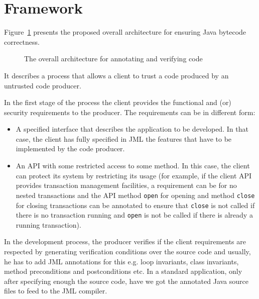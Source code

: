 \section{Framework}
\label{architecture_s}	
Figure~\ref{architecture} presents the proposed overall architecture for ensuring Java bytecode correctness. 
\begin{figure}[ht!]
\begin{center}
\caption{The overall architecture for annotating and verifying code}
\label{architecture}
\end{center}
\end{figure}
It describes a process that allows a client to trust a code produced by an untrusted code producer.

In the first stage of the process the client provides the functional and (or) security requirements to the producer. The requirements can be in different form:
\begin{itemize}
\item A specified interface that describes the application to be developed. In that case, the client has fully specified in JML the features that have to be implemented by the code producer.
\item An API with some restricted access to some method. In this case, the client can protect its system by restricting its usage (for example, if the client API provides transaction management facilities, a requirement can be for no nested transactions and the API method \texttt{open} for opening and method \texttt{close} for closing transactions can be annotated to ensure that \texttt{close} is not called if there is no transaction running and \texttt{open} is not be called if there is already a running transaction).   
\end{itemize}


In the development process, the producer verifies if the client requirements are respected by generating verification conditions
over the source code and usually, he has to add JML annotations for this e.g. loop invariants, class invariants, method preconditions
 and postconditions etc. In a standard application, only after specifying enough the source code, 
have we got the annotated Java source files to feed to the JML compiler.



